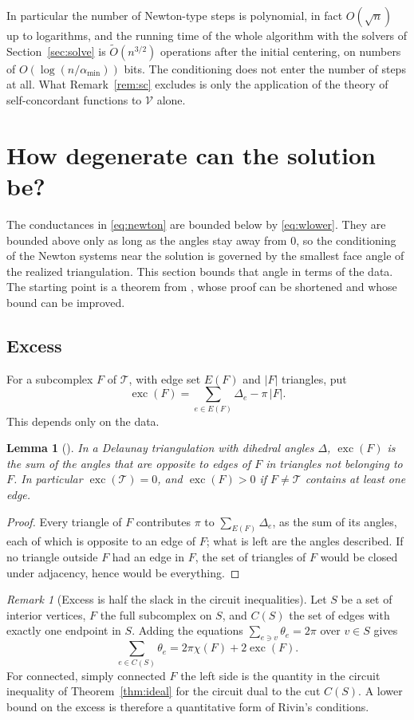 \documentclass[11pt]{amsart}
\newtheorem{lemma}[theorem]{Lemma}
\theoremstyle{definition}
\theoremstyle{remark}
\newtheorem{remark}[theorem]{Remark}
\newcommand{\cT}{\mathcal{T}}
\newcommand{\Ot}{\widetilde{O}}
\DeclareMathOperator{\exc}{exc}
\begin{document}
In particular the number of Newton-type steps is polynomial, in fact $O(\sqrt n)$ up to logarithms, and the running time of the whole algorithm with the solvers of Section~\ref{sec:solve} is $\Ot(n^{3/2})$ operations after the initial centering, on numbers of $O(\log(n/\alpha_{\min}))$ bits.
The conditioning does not enter the number of steps at all. What Remark~\ref{rem:sc} excludes is only the application of the theory of self-concordant functions to $\mathcal V$ alone.


\section{How degenerate can the solution be?}\label{sec:degenerate}

The conductances in \eqref{eq:newton} are bounded below by \eqref{eq:wlower}. They are bounded above only as long as the angles stay away from $0$, so the conditioning of the Newton systems near the solution is governed by the smallest face angle of the realized triangulation.
This section bounds that angle in terms of the data. The starting point is a theorem from \cite{Riv03}, whose proof can be shortened and whose bound can be improved.

\subsection{Excess}
For a subcomplex $F$ of $\cT$, with edge set $E(F)$ and $|F|$ triangles, put
\[
\exc(F)=\sum_{e\in E(F)}\Delta_e-\pi\,|F| .
\]
This depends only on the data.

\begin{lemma}[{\cite[Lemma~6.5]{Riv03}}]\label{lem:excess}
In a Delaunay triangulation with dihedral angles $\Delta$, $\exc(F)$ is the sum of the angles that are opposite to edges of $F$ in triangles not belonging to $F$. In particular $\exc(\cT)=0$, and $\exc(F)>0$ if $F\ne\cT$ contains at least one edge.
\end{lemma}

\begin{proof}
Every triangle of $F$ contributes $\pi$ to $\sum_{E(F)}\Delta_e$, as the sum of its angles, each of which is opposite to an edge of $F$; what is left are the angles described. If no triangle outside $F$ had an edge in $F$, the set of triangles of $F$ would be closed under adjacency, hence would be everything.
\end{proof}

\begin{remark}[Excess is half the slack in the circuit inequalities]
Let $S$ be a set of interior vertices, $F$ the full subcomplex on $S$, and $C(S)$ the set of edges with exactly one endpoint in $S$. Adding the equations $\sum_{e\ni v}\theta_e=2\pi$ over $v\in S$ gives
\[
\sum_{e\in C(S)}\theta_e=2\pi\chi(F)+2\exc(F).
\]
For connected, simply connected $F$ the left side is the quantity in the circuit inequality of Theorem~\ref{thm:ideal} for the circuit dual to the cut $C(S)$. A lower bound on the excess is therefore a quantitative form of Rivin's conditions.
\end{remark}
\end{document}

